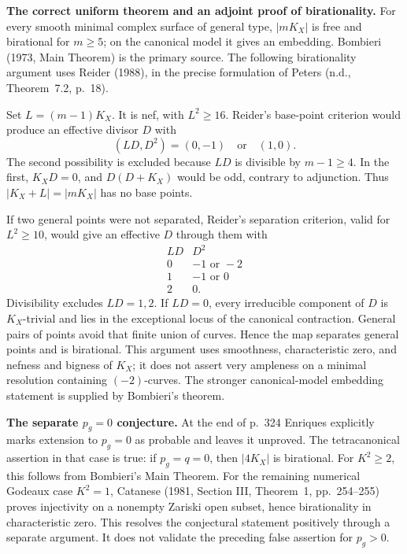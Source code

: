 \textbf{The correct uniform theorem and an adjoint proof of birationality.}
For every smooth minimal complex surface of general type, \(|mK_X|\) is free and birational for \(m\geq5\); on the canonical model it gives an embedding. Bombieri (1973, Main Theorem) is the primary source. The following birationality argument uses Reider (1988), in the precise formulation of Peters (n.d., Theorem~7.2, p.~18).

Set \(L=(m-1)K_X\). It is nef, with \(L^2\geq16\). Reider's base-point criterion would produce an effective divisor \(D\) with
\[
(LD,D^2)=(0,-1)\quad\text{or}\quad(1,0).
\]
The second possibility is excluded because \(LD\) is divisible by \(m-1\geq4\). In the first, \(K_XD=0\), and \(D(D+K_X)\) would be odd, contrary to adjunction. Thus \(|K_X+L|=|mK_X|\) has no base points.

If two general points were not separated, Reider's separation criterion, valid for \(L^2\geq10\), would give an effective \(D\) through them with
\[
\begin{array}{c|c}
LD&D^2\\ \hline
0&-1\text{ or }-2\\
1&-1\text{ or }0\\
2&0 .
\end{array}
\]
Divisibility excludes \(LD=1,2\). If \(LD=0\), every irreducible component of \(D\) is \(K_X\)-trivial and lies in the exceptional locus of the canonical contraction. General pairs of points avoid that finite union of curves. Hence the map separates general points and is birational. This argument uses smoothness, characteristic zero, and nefness and bigness of \(K_X\); it does not assert very ampleness on a minimal resolution containing \((-2)\)-curves. The stronger canonical-model embedding statement is supplied by Bombieri's theorem.

\textbf{The separate \(p_g=0\) conjecture.}
At the end of p.~324 Enriques explicitly marks extension to \(p_g=0\) as probable and leaves it unproved. The tetracanonical assertion in that case is true: if \(p_g=q=0\), then \(|4K_X|\) is birational. For \(K^2\geq2\), this follows from Bombieri's Main Theorem. For the remaining numerical Godeaux case \(K^2=1\), Catanese (1981, Section III, Theorem~1, pp.~254--255) proves injectivity on a nonempty Zariski open subset, hence birationality in characteristic zero. This resolves the conjectural statement positively through a separate argument. It does not validate the preceding false assertion for \(p_g>0\).

